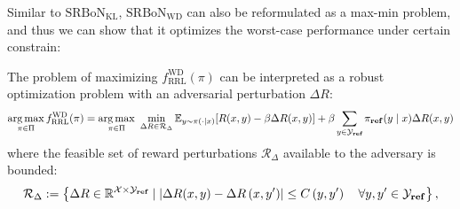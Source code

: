 Similar to $\mathrm{SRBoN}_{\mathrm{KL}}$, $\mathrm{SRBoN}_{\mathrm{WD}}$ can also be reformulated as a max-min problem, and thus we can show that it optimizes the worst-case performance under certain constrain:
\begin{theorem}\label{theory:wd}
The problem of maximizing $f_\mathrm{RRL}^{\mathrm{WD}}(\pi)$ can be interpreted as a robust optimization problem with an adversarial perturbation $\Delta R$:
\begin{equation}
    \operatorname*{arg\,max}_{\pi \in \Pi} f_\mathrm{RRL}^{\mathrm{WD}}(\pi) = \operatorname*{arg\,max}_{\pi \in \Pi} \,\,\min_{\Delta R \in \mathcal{R}_{\Delta}}\mathbb{E}_{y \sim \pi(\cdot \mid x)}[R(x,y) - \beta \Delta R(x,y)] + \beta \sum_{y \in \mathcal{Y}_{\textbf{ref}}} \pi_{\textnormal{\textbf{ref}}}(y \mid x)\Delta R(x,y)
\end{equation}
where the feasible set of reward perturbations $\mathcal{R}_{\Delta}$ available to the adversary is bounded:
\begin{equation}\label{eq:wd_delta_set}
\mathcal{R}_{\Delta}:=\left\{\Delta R \in \mathbb{R}^{\mathcal{X}\times\mathcal{Y}_{\textbf{ref}}} \mid \left|\Delta R(x,y)-\Delta R\left(x,y^{\prime}\right)\right| \leq C\left(y, y^{\prime}\right) \quad \forall y, y^{\prime} \in \mathcal{Y}_{\textnormal{\textbf{ref}}}\right\},
\end{equation}
\end{theorem}

